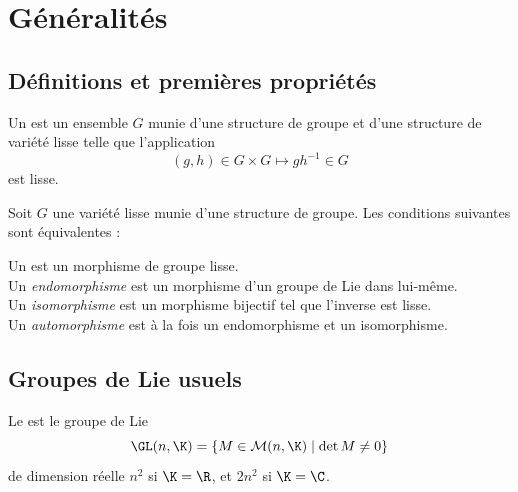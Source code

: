 
\section{Généralités}

\subsection{Définitions et premières propriétés}

\begin{definition}
    Un  est un ensemble $G$ munie d'une structure de groupe et d'une structure de variété lisse telle que l'application 
    $$(g, h) \in G\times G \mapsto gh^{-1} \in G$$
    est lisse.
\end{definition}

\begin{proposition}
    Soit $G$ une variété lisse munie d'une structure de groupe. Les conditions suivantes sont équivalentes :
\end{proposition}


\begin{definition}
    Un  est un morphisme de groupe lisse. \\
    Un \emph{endomorphisme} est un morphisme d'un groupe de Lie dans lui-même. \\
    Un \emph{isomorphisme} est un morphisme bijectif tel que l'inverse est lisse. \\
    Un \emph{automorphisme} est à la fois un endomorphisme et un isomorphisme.
\end{definition}

\subsection{Groupes de Lie usuels}

\begin{definition}
    Le  est le groupe de Lie
    $$\GL(n, \K) = \{ M \in \mathcal{M}(n, \K) \mid \det M \neq 0 \}$$
    de dimension réelle $n^2$ si $\K = \R$, et $2n^2$ si
  $\K = \C$.
\end{definition}

